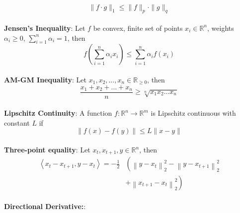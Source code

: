 {\begin{theorem}[]{}
    \vspace{-5pt}\\
    \begin{equation*}
        \|f \cdot g\|_1 \leq \|f\|_p \cdot \|g\|_q
    \end{equation*}
    \vspace{-5pt}\\
    \textbf{Jensen's Inequality}:
    Let $f$ be convex, finite set of points $x_i \in \mathbb{R}^n$, weights $\alpha_i \geq 0$, $\sum_{i=1}^{n}\alpha_i = 1$, then
    \vspace{-5pt}\\
    \begin{equation*}
        f\left(\sum_{i=1}^{n}\alpha_ix_i\right) \leq \sum_{i=1}^{n}\alpha_if(x_i)
    \end{equation*}
    \vspace{-5pt}\\
    \textbf{AM-GM Inequality}:
    Let $x_1, x_2, \ldots, x_n \in \mathbb{R}_{\geq0}$, then
    \vspace{-5pt}\\
    \begin{equation*}
        \frac{x_1 + x_2 + \ldots + x_n}{n} \geq \sqrt[n]{x_1x_2\ldots x_n}
    \end{equation*}
    \vspace{-5pt}\\
    \textbf{Lipschitz Continuity}:
    A function $f: \mathbb{R}^n \rightarrow \mathbb{R}^m$ is Lipschitz continuous with constant $L$ if
    \vspace{-5pt}\\
    \begin{equation*}
        \|f(x) - f(y)\| \leq L\|x - y\|
    \end{equation*}
    \vspace{-5pt}\\
    \textbf{Three-point equality}:
    Let $x_t, x_{t+1}, y \in \mathbb{R}^n$, then
    \vspace{-5pt}\\
    $$
    \begin{aligned}
        \left\langle x_t-x_{t+1}, y-x_t\right\rangle=-\frac{1}{2}&\left(\left\|y-x_t\right\|_2^2-\left\|y-x_{t+1}\right\|_2^2 \right.\\
        & \left. +\left\|x_{t+1}-x_t\right\|_2^2\right)
    \end{aligned}
    $$
    \vspace{-3pt}\\
    \textbf{Directional Derivative:}:

\end{theorem}}
